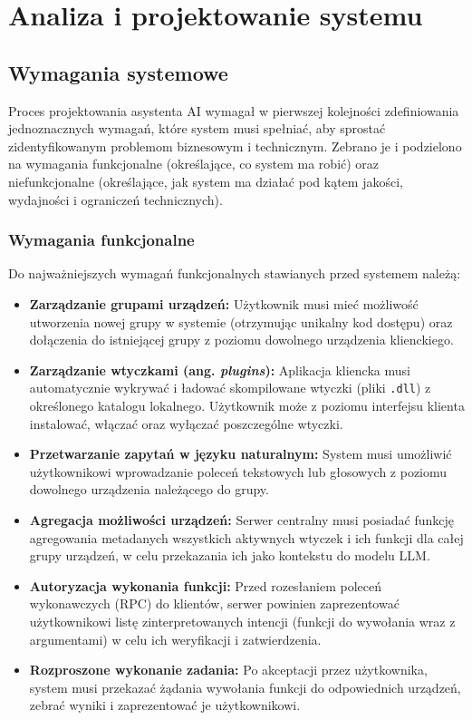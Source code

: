 \chapter{Analiza i projektowanie systemu}
\label{cha:projektowanie}

\section{Wymagania systemowe}
\label{sec:wymagania}
Proces projektowania asystenta AI wymagał w pierwszej kolejności zdefiniowania jednoznacznych wymagań, które system musi spełniać, aby sprostać zidentyfikowanym problemom biznesowym i technicznym. Zebrano je i podzielono na wymagania funkcjonalne (określające, co system ma robić) oraz niefunkcjonalne (określające, jak system ma działać pod kątem jakości, wydajności i ograniczeń technicznych).

\subsection{Wymagania funkcjonalne}
\label{subsec:wymagania_funkcjonalne}
Do najważniejszych wymagań funkcjonalnych stawianych przed systemem należą:
\begin{itemize}
	\item \textbf{Zarządzanie grupami urządzeń:} Użytkownik musi mieć możliwość utworzenia nowej grupy w systemie (otrzymując unikalny kod dostępu) oraz dołączenia do istniejącej grupy z poziomu dowolnego urządzenia klienckiego.
	\item \textbf{Zarządzanie wtyczkami (ang. \textit{plugins}):} Aplikacja kliencka musi automatycznie wykrywać i ładować skompilowane wtyczki (pliki \texttt{.dll}) z określonego katalogu lokalnego. Użytkownik może z poziomu interfejsu klienta instalować, włączać oraz wyłączać poszczególne wtyczki.
	\item \textbf{Przetwarzanie zapytań w języku naturalnym:} System musi umożliwić użytkownikowi wprowadzanie poleceń tekstowych lub głosowych z poziomu dowolnego urządzenia należącego do grupy.
	\item \textbf{Agregacja możliwości urządzeń:} Serwer centralny musi posiadać funkcję agregowania metadanych wszystkich aktywnych wtyczek i ich funkcji dla całej grupy urządzeń, w celu przekazania ich jako kontekstu do modelu LLM.
	\item \textbf{Autoryzacja wykonania funkcji:} Przed rozesłaniem poleceń wykonawczych (RPC) do klientów, serwer powinien zaprezentować użytkownikowi listę zinterpretowanych intencji (funkcji do wywołania wraz z argumentami) w celu ich weryfikacji i zatwierdzenia.
	\item \textbf{Rozproszone wykonanie zadania:} Po akceptacji przez użytkownika, system musi przekazać żądania wywołania funkcji do odpowiednich urządzeń, zebrać wyniki i zaprezentować je użytkownikowi.
\end{itemize}

